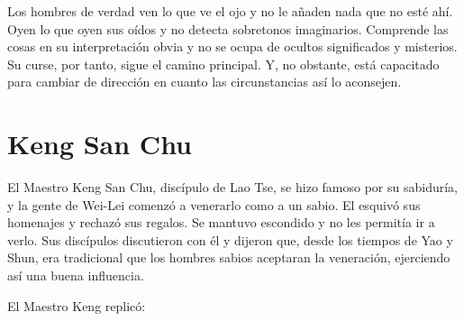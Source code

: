 \documentclass[book,b5paper,hidelinks,final]{memoir}
\begin{document}
	Los hombres de verdad ven lo que ve el ojo y no le añaden nada que no
	esté ahí. Oyen lo que oyen sus oídos y no detecta sobretonos
	imaginarios. Comprende las cosas en su interpretación obvia y no se
	ocupa de ocultos significados y misterios. Su curse, por tanto, sigue el
	camino principal. Y, no obstante, está capacitado para cambiar de
	dirección en cuanto las circunstancias así lo aconsejen.
	
	\chapter*{Keng San Chu}
	
	El Maestro Keng San Chu, discípulo de Lao Tse, se hizo famoso por su
	sabiduría, y la gente de Wei-Lei comenzó a venerarlo como a un sabio. El
	esquivó sus homenajes y rechazó sus regalos. Se mantuvo escondido y no
	les permitía ir a verlo. Sus discípulos discutieron con él y dijeron
	que, desde los tiempos de Yao y Shun, era tradicional que los hombres
	sabios aceptaran la veneración, ejerciendo así una buena influencia.
	
	El Maestro Keng replicó:
	
\end{document}
